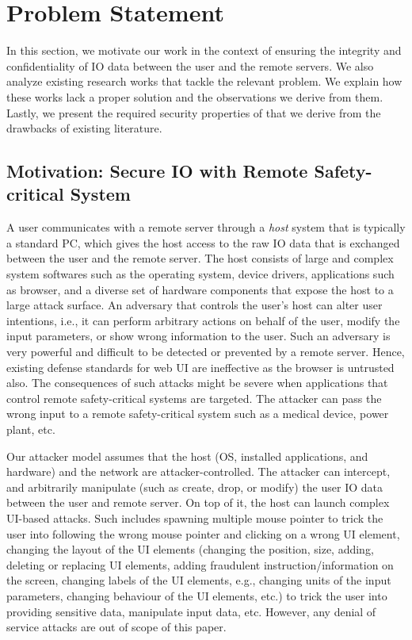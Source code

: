 \section{Problem Statement}
\label{sec:problemStatement}

In this section, we motivate our work in the context of ensuring the integrity and confidentiality of IO data between the user and the remote servers. We also analyze existing research works that tackle the relevant problem. We explain how these works lack a proper solution and the observations we derive from them. Lastly, we present the required security properties of \name that we derive from the drawbacks of existing literature.

\subsection{Motivation: Secure IO with Remote Safety-critical System}

A user communicates with a remote server through a \emph{host} system that is typically a standard PC, which gives the host access to the raw IO data that is exchanged between the user and the remote server. The host consists of large and complex system softwares such as the operating system, device drivers, applications such as browser, and a diverse set of hardware components that expose the host to a large attack surface. An adversary that controls the user's host can alter user intentions, i.e., it can perform arbitrary actions on behalf of the user, modify the input parameters, or show wrong information to the user. Such an adversary is very powerful and difficult to be detected or prevented by a remote server. Hence, existing defense standards for web UI are ineffective as the browser is untrusted also. The consequences of such attacks might be severe when applications that control remote safety-critical systems are targeted. The attacker can pass the wrong input to a remote safety-critical system such as a medical device, power plant, etc.

 Our attacker model assumes that the host (OS, installed applications, and hardware) and the network are attacker-controlled. The attacker can intercept, and arbitrarily manipulate (such as create, drop, or modify) the user IO data between the user and remote server. On top of it, the host can launch complex UI-based attacks. Such includes spawning multiple mouse pointer to trick the user into following the wrong mouse pointer and clicking on a wrong UI element, changing the layout of the UI elements (changing the position, size, adding, deleting or replacing UI elements, adding fraudulent instruction/information on the screen, changing labels of the UI elements, e.g., changing units of the input parameters, changing behaviour of the UI elements, etc.) to trick the user into providing sensitive data, manipulate input data, etc. However, any denial of service attacks are out of scope of this paper.

